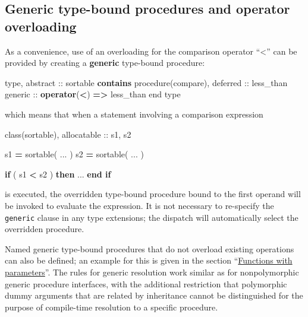 \documentclass[
  paper=a4,
  ,captions=tableheading
]{scrartcl}
\newenvironment{Shaded}{\begin{snugshade}}{\end{snugshade}}
\newcommand{\DataTypeTok}[1]{\textcolor[rgb]{0.13,0.29,0.53}{#1}}
\newcommand{\KeywordTok}[1]{\textcolor[rgb]{0.13,0.29,0.53}{\textbf{#1}}}
\newcommand{\NormalTok}[1]{#1}
\newcommand{\OperatorTok}[1]{\textcolor[rgb]{0.81,0.36,0.00}{\textbf{#1}}}
\begin{document}
\subsection{Generic type-bound procedures and operator
overloading}\label{generic-type-bound-procedures-and-operator-overloading}

As a convenience, use of an overloading for the comparison operator
``\textless{}'' can be provided by creating a \textbf{generic}
type-bound procedure:

\begin{Shaded}
\begin{Highlighting}[]
\DataTypeTok{type}\NormalTok{, }\DataTypeTok{abstract} \DataTypeTok{::}\NormalTok{ sortable}
\KeywordTok{contains}
  \DataTypeTok{procedure(compare)}\NormalTok{, }\DataTypeTok{deferred} \DataTypeTok{::}\NormalTok{ less\_than}
  \DataTypeTok{generic} \DataTypeTok{::} \KeywordTok{operator}\NormalTok{(}\OperatorTok{\textless{}}\NormalTok{) }\KeywordTok{=}\OperatorTok{\textgreater{}}\NormalTok{ less\_than}
\DataTypeTok{end type}
\end{Highlighting}
\end{Shaded}

which means that when a statement involving a comparison expression

\begin{Shaded}
\begin{Highlighting}[]
\DataTypeTok{class(sortable)}\NormalTok{, }\DataTypeTok{allocatable} \DataTypeTok{::}\NormalTok{ s1, s2}

\NormalTok{s1 }\KeywordTok{=}\NormalTok{ sortable( ... )}
\NormalTok{s2 }\KeywordTok{=}\NormalTok{ sortable( ... )}

\KeywordTok{if}\NormalTok{ ( s1 }\OperatorTok{\textless{}}\NormalTok{ s2 ) }\KeywordTok{then}
\NormalTok{   ...}
\KeywordTok{end if}
\end{Highlighting}
\end{Shaded}

is executed, the overridden type-bound procedure bound to the first
operand will be invoked to evaluate the expression. It is not necessary
to re-specify the \texttt{generic} clause in any type extensions; the
dispatch will automatically select the overridden procedure.

Named generic type-bound procedures that do not overload existing
operations can also be defined; an example for this is given in the
section ``\hyperref[sec:functions_with_parameters]{Functions with
parameters}''. The rules for generic resolution work similar as for
nonpolymorphic generic procedure interfaces, with the additional
restriction that polymorphic dummy arguments that are related by
inheritance cannot be distinguished for the purpose of compile-time
resolution to a specific procedure.
\end{document}
